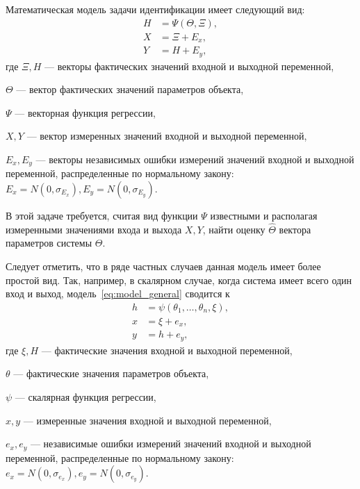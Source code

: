 Математическая модель задачи идентификации имеет следующий вид:
\begin{equation}
  \label{eq:model_general}
  \begin{aligned}
    H &= \Psi (\Theta, \Xi), \\
    X &= \Xi + E_x, \\
    Y &= H + E_y,
  \end{aligned}
\end{equation}
где \( \Xi, H \) --- векторы фактических значений входной и выходной переменной, \par
\( \Theta \) --- вектор фактических значений параметров объекта, \par
\( \Psi \) --- векторная функция регрессии, \par
\( X, Y \) ---  вектор измеренных значений входной и выходной переменной, \par
\( E_x, E_y \) --- векторы независимых ошибки измерений значений входной и выходной переменной,
распределенные по нормальному закону:
{\color{red} \( E_x = N(0, \sigma_{E_x}), E_y = N(0, \sigma_{E_y}) \)}.

В этой задаче требуется,
считая вид функции \( \Psi \) известными и располагая измеренными значениями входа и выхода \( X, Y \),
найти оценку $ \hat{\Theta} $ вектора параметров системы $ \Theta $.

Следует отметить, что в ряде частных случаев данная модель имеет более простой вид.
Так, например, в скалярном случае, когда система имеет всего один вход и выход,
модель~\ref{eq:model_general} сводится к
\begin{equation}
  \label{eq:model_scalar}
  \begin{aligned}
    h &= \psi (\theta_1, \ldots, \theta_n, \xi), \\
    x &= \xi + e_x, \\
    y &= h + e_y,
  \end{aligned}
\end{equation}
где \( \xi, H \) --- фактические значения входной и выходной переменной, \par
\( \theta \) --- фактические значения параметров объекта, \par
\( \psi \) --- скалярная функция регрессии, \par
\( x, y \) --- измеренные значения входной и выходной переменной, \par
\( e_x, e_y \) --- независимые ошибки измерений значений входной и выходной переменной,
распределенные по нормальному закону: \( e_x = N(0, \sigma_{e_x}), e_y = N(0, \sigma_{e_y}) \).

